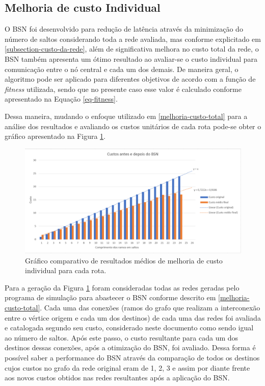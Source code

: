 \subsection{Melhoria de custo Individual}
O BSN foi desenvolvido para redução de latência através da minimização do número de saltos considerando toda a rede avaliada, mas conforme explicitado em \ref{subsection-custo-da-rede}, além de significativa melhora no custo total da rede, o BSN também apresenta um ótimo resultado ao avaliar-se o custo individual para comunicação entre o nó central e cada um dos demais. De maneira geral, o algoritmo pode ser aplicado para diferentes objetivos de acordo com a função de \emph{fitness} utilizada, sendo que no presente caso esse valor é calculado conforme apresentado na Equação \ref{eq-fitness}.

Dessa maneira, mudando o enfoque utilizado em \ref{melhoria-custo-total} para a análise dos resultados e avaliando os custos unitários de cada rota pode-se obter o gráfico apresentado na Figura \ref{fig_graph_melhoria_por_custo}.

\begin{figure} [ht]%
	\centering
	\includegraphics[width=1\textwidth]{./figuras/Melhoria-por-custo.png} %
	\caption[Custo antes e depois do BSN]{Gráfico comparativo de resultados médios de melhoria de custo individual para cada rota.}
	\label{fig_graph_melhoria_por_custo}
\end{figure}

Para a geração da Figura \ref{fig_graph_melhoria_por_custo} foram consideradas todas as redes geradas pelo programa de simulação para abastecer o BSN conforme descrito em \ref{melhoria-custo-total}. Cada uma das conexões (ramos do grafo que realizam a interconexão entre o vértice origem e cada um dos destinos) de cada uma das redes foi avaliada e catalogada segundo seu custo, considerado neste documento como sendo igual ao número de saltos. Após este passo, o custo resultante para cada um dos destinos dessas conexões, após a otimização do BSN, foi avaliado. Dessa forma é possível saber a performance do BSN através da comparação de todos os destinos cujos custos no grafo da rede original eram de 1, 2, 3 e assim por diante frente aos novos custos obtidos nas redes resultantes após a aplicação do BSN.

